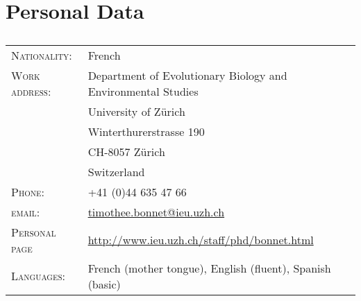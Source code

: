\documentclass[a4paper,10pt]{article} %
\begin{document}
\pagestyle{empty} %

\par{}

\section*{Personal Data}
\subsection*{}
\begin{tabular}{p{4cm} p{11cm}}
\hfill \textsc{Nationality:} & French\\
\hfill \textsc{Work address:} & Department of Evolutionary Biology and Environmental Studies\\ 
									& University of Z\"{u}rich\\
									& Winterthurerstrasse 190\\
									& CH-8057 Z\"{u}rich\\
									& Switzerland \\
\hfill \textsc{Phone:} & +41 (0)44 635 47 66\\
\hfill \textsc{email:} & \href{mailto:timothee.bonnet@ieu.uzh.ch}{timothee.bonnet@ieu.uzh.ch}\\
\hfill \textsc{Personal page} & \url{http://www.ieu.uzh.ch/staff/phd/bonnet.html} \\
\hfill \textsc{Languages:} & French (mother tongue), English (fluent), Spanish (basic)
\end{tabular}
\end{document}
